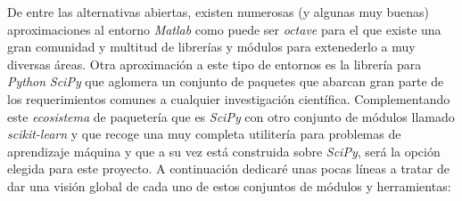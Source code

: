 \documentclass[10pt,a4paper]{report}
\begin{document}
De entre las alternativas abiertas, existen numerosas (y algunas muy buenas) aproximaciones al entorno \textit{Matlab} como puede ser \textit{octave} para el que existe una gran comunidad y multitud de librerías y módulos para extenederlo a muy diversas áreas. Otra aproximación a este tipo de entornos es la librería para \textit{Python} \textit{SciPy} que aglomera un conjunto de paquetes que abarcan gran parte de los requerimientos comunes a cualquier investigación científica. Complementando este \textit{ecosistema} de paquetería que es \textit{SciPy} con otro conjunto de módulos llamado \textit{scikit-learn} y que recoge una muy completa utilitería para problemas de aprendizaje máquina y que a su vez está construida sobre \textit{SciPy}, será la opción elegida para este proyecto. A continuación dedicaré unas pocas líneas a tratar de dar una visión global de cada uno de estos conjuntos de módulos y herramientas:
\end{document}
